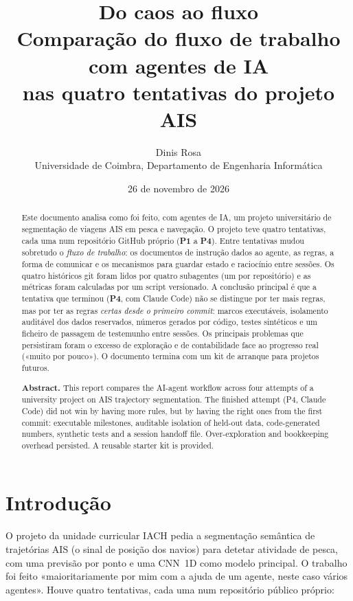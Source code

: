 \documentclass[11pt,a4paper]{article}
\title{\textbf{Do caos ao fluxo}\\[4pt]
\large Comparação do fluxo de trabalho com agentes de IA\\ nas quatro tentativas do projeto AIS}
\author{Dinis Rosa\\[2pt]\small Universidade de Coimbra, Departamento de Engenharia Informática}
\date{26 de novembro de 2026}
\newcommand{\Pum}{\textbf{P1}}
\newcommand{\Pquatro}{\textbf{P4}}
\begin{document}
\maketitle

\begin{abstract}
\noindent Este documento analisa como foi feito, com agentes de IA, um projeto universitário de
segmentação de viagens AIS em pesca e navegação. O projeto teve quatro tentativas, cada uma num
repositório GitHub próprio (\Pum{} a \Pquatro). Entre tentativas mudou sobretudo o \emph{fluxo de
trabalho}: os documentos de instrução dados ao agente, as regras, a forma de comunicar e os
mecanismos para guardar estado e raciocínio entre sessões. Os quatro históricos git foram lidos
por quatro subagentes (um por repositório) e as métricas foram calculadas por um script
versionado. A conclusão principal é que a tentativa que terminou (\Pquatro, com Claude Code) não
se distingue por ter mais regras, mas por ter as regras \emph{certas desde o primeiro commit}:
marcos executáveis, isolamento auditável dos dados reservados, números gerados por código,
testes sintéticos e um ficheiro de passagem de testemunho entre sessões. Os principais problemas
que persistiram foram o excesso de exploração e de contabilidade face ao progresso real
(«muito por pouco»). O documento termina com um kit de arranque para projetos futuros.

\medskip
\noindent\textbf{Abstract.} This report compares the AI-agent workflow across four attempts of a
university project on AIS trajectory segmentation. The finished attempt (P4, Claude Code) did not
win by having more rules, but by having the right ones from the first commit: executable
milestones, auditable isolation of held-out data, code-generated numbers, synthetic tests and a
session handoff file. Over-exploration and bookkeeping overhead persisted. A reusable starter kit
is provided.
\end{abstract}

\tableofcontents
\newpage

\section{Introdução}

O projeto da unidade curricular IACH pedia a segmentação semântica de trajetórias AIS (o sinal de
posição dos navios) para detetar atividade de pesca, com uma previsão por ponto e uma CNN~1D como
modelo principal. O trabalho foi feito «maioritariamente por mim com a ajuda de um agente, neste
caso vários agentes». Houve quatro tentativas, cada uma num repositório público próprio:
\end{document}
